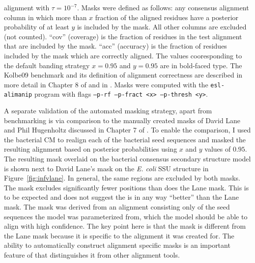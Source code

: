 \begin{table}
{  alignment with $\tau=10^{-7}$. Masks were defined as follows: any
  consensus alignment column in which more than $x$ fraction of the
  aligned residues have a posterior probability of at least $y$ is
  included by the mask. All other columns are excluded (not
  counted). ``cov'' (coverage) is the fraction of residues in the test
  alignment that are included by the mask. ``acc'' (accuracy) is the
  fraction of residues included by the mask which are correctly
  aligned. The values cooresponding to the  default
  banding strategy $x=0.95$ and $y=0.95$ are in bold-faced type.  The
  Kolbe09 benchmark and its definition of alignment correctness are
  described in more detail in Chapter 8 of \cite{Nawrocki09b} and in
  \cite{KolbeEddy09}. Masks were computed with the {\tt esl-alimanip}
  program with flags {\tt --p-rf --p-fract <x> --p-thresh <y>}.}
\label{tbl:kolbe09-pp}
\end{table}

A separate validation of the automated masking strategy, apart from
benchmarking is via comparison to the manually created masks of David
Lane and Phil Hugenholtz discussed in Chapter 7 of \cite{Nawrocki09b}. To
enable the comparison, I used the  bacterial CM to
realign each of the bacterial seed sequences and masked the resulting
alignment based on posterior probabilities using $x$ and $y$ values of
$0.95$. The resulting mask overlaid on the  bacterial
consensus secondary structure model is shown next to David Lane's mask
on the \emph{E. coli} SSU structure in Figure~\ref{fig:infvlane}. In
general, the same regions are excluded by both masks. The
 mask excludes significantly fewer positions than does
the Lane mask.  This is to be expected and does not suggest the
 is in any way ``better'' than the Lane mask.  The
 mask was derived from an alignment consisting only of
the seed sequences the model was parameterized from, which the model should
be able to align with high confidence. The key point here is that the
 mask is different from the Lane mask because it is specific to the
alignment it was created for. The ability to automatically construct 
alignment specific masks is an important feature of  that
distinguishes it from other alignment tools. 


